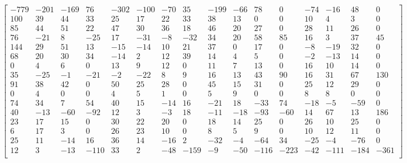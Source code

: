 \documentclass[10pt,a4paper]{jsarticle}
\begin{document}
\begin{align}
\begin{bmatrix}
-779 & -201 & -169 & 76 & -302 & -100 & -70 & 35 & -199 & -66 & 78 & 0 & -74 & -16 & 48 & 0 \\
100 & 39 & 44 & 33 & 25 & 17 & 22 & 33 & 38 & 13 & 0 & 0 & 10 & 4 & 3 & 0 \\
85 & 44 & 51 & 22 & 47 & 30 & 36 & 18 & 46 & 20 & 27 & 0 & 28 & 11 & 26 & 0 \\
76 & -21 & 8 & -25 & 17 & -31 & -8 & -32 & 34 & 20 & 58 & 85 & 16 & 3 & 37 & 45 \\
144 & 29 & 51 & 13 & -15 & -14 & 10 & 21 & 37 & 0 & 17 & 0 & -8 & -19 & 32 & 0 \\
68 & 20 & 30 & 34 & -14 & 2 & 12 & 39 & 14 & 4 & 5 & 0 & -2 & -13 & 14 & 0 \\
0 & 4 & 6 & 0 & 13 & 9 & 12 & 0 & 11 & 7 & 13 & 0 & 16 & 10 & 14 & 0 \\
35 & -25 & -1 & -21 & -2 & -22 & 8 & 9 & 16 & 13 & 43 & 90 & 16 & 31 & 67 & 130 \\
91 & 38 & 42 & 0 & 50 & 25 & 28 & 0 & 45 & 15 & 31 & 0 & 25 & 12 & 29 & 0 \\
0 & 4 & 0 & 0 & 4 & 5 & 1 & 0 & 5 & 9 & 0 & 0 & 8 & 8 & 0 & 0 \\
74 & 34 & 7 & 54 & 40 & 15 & -14 & 16 & -21 & 18 & -33 & 74 & -18 & -5 & -59 & 0 \\
40 & -13 & -60 & -92 & 12 & 3 & -3 & 18 & -11 & -18 & -93 & -60 & 14 & 67 & 13 & 186 \\
23 & 17 & 15 & 0 & 30 & 22 & 20 & 0 & 18 & 14 & 25 & 0 & 26 & 10 & 25 & 0 \\
6 & 17 & 3 & 0 & 26 & 23 & 10 & 0 & 8 & 5 & 9 & 0 & 10 & 12 & 11 & 0 \\
25 & 11 & -14 & 16 & 36 & 14 & -16 & 2 & -32 & -4 & -64 & 34 & -25 & -4 & -76 & 0 \\
12 & 3 & -13 & -110 & 33 & 2 & -48 & -159 & -9 & -50 & -116 & -223 & -42 & -111 & -184 & -361 \\
\end{bmatrix}
\end{align}
\end{document}
